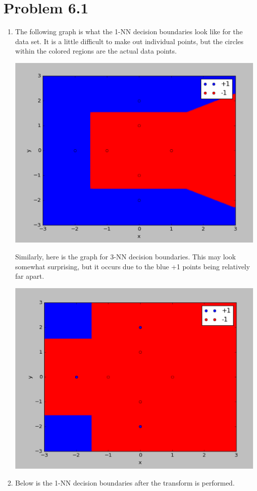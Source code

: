 \documentclass[12pt]{article}
\begin{document}
\section*{Problem 6.1}
\begin{enumerate}[label=(\alph*)]
	\item The following graph is what the 1-NN decision boundaries look like for the data set. It is a little difficult to make out individual points, but the circles within the colored regions are the actual data points.
	
	\includegraphics[scale=0.6]{6-1a1.png}
	
	Similarly, here is the graph for 3-NN decision boundaries. This may look somewhat surprising, but it occurs due to the blue +1 points being relatively far apart.
	
	\includegraphics[scale=0.6]{6-1a2.png}
	\item Below is the 1-NN decision boundaries after the transform is performed.
	

\end{enumerate}
\end{document}
